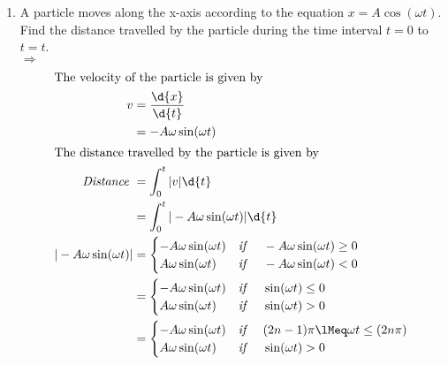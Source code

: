 \documentclass{article}
\newenvironment{solution}{\color{red!85!black}}{}
\begin{document}
\begin{enumerate}
    \item A particle moves along the x-axis according to the equation $x=A\cos(\omega t)$. Find the distance travelled by the particle during the time interval $t=0$ to $t=t$.\\
    \begin{solution}
        $\Rightarrow$
        \begin{align*}
            \intertext{The velocity of the particle is given by}
            v &= \dfrac{\d{x}}{\d{t}}\\
            &= -A\omega\sin(\omega t)\\
            \intertext{The distance travelled by the particle is given by}
            \textit{Distance } &= \int_{0}^{t} |v|\d{t}\\
            &= \int_{0}^{t} |-A\omega\sin(\omega t)|\d{t}\\
            |-A\omega\sin(\omega t)| &= \begin{cases}
                -A\omega\sin(\omega t) & \textit{if \quad} -A\omega\sin(\omega t) \geq 0\\
                A\omega\sin(\omega t) & \textit{if \quad} -A\omega\sin(\omega t) < 0
            \end{cases} \\  
            &= \begin{cases}
                -A\omega\sin(\omega t) & \textit{if \quad} \sin(\omega t) \leq 0\\
                A\omega\sin(\omega t) & \textit{if \quad} \sin(\omega t) > 0
            \end{cases}\\
            &= \begin{cases}
                -A\omega\sin(\omega t) & \textit{if \quad} (2n-1)\pi \lMeq \omega t \leq (2n\pi)\\
                A\omega\sin(\omega t) & \textit{if \quad} \sin(\omega t) > 0
            \end{cases}\\ 
        \end{align*}
    \end{solution}

\end{enumerate}
\end{document}
